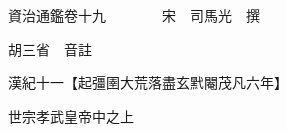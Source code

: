 










 


 
 


 

  
  
  
  
  





  
  
  
  
  
 
  

  

  
  
  



  

 
 

  
   




  

  
  


  　　資治通鑑卷十九　　　　宋　司馬光　撰

　　胡三省　音註

　　漢紀十一【起彊圉大荒落盡玄黓閹茂凡六年】

　　世宗孝武皇帝中之上

